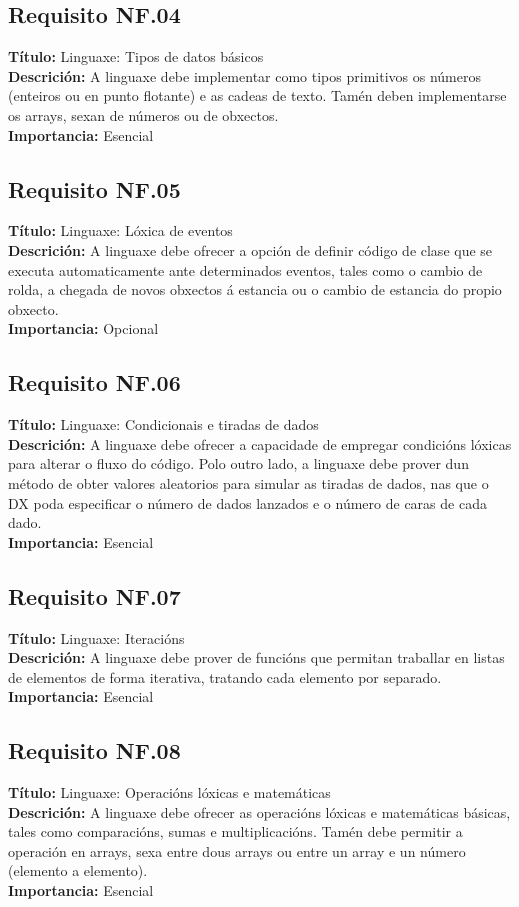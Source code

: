 \subsection{Requisito NF.04}
{\bf Título:} Linguaxe: Tipos de datos básicos\\
{\bf Descrición:} A linguaxe debe implementar como tipos primitivos os números (enteiros ou en punto flotante) e as cadeas de texto. Tamén deben implementarse os arrays, sexan de números ou de obxectos.\\
{\bf Importancia:} Esencial

\subsection{Requisito NF.05}
{\bf Título:} Linguaxe: Lóxica de eventos\\
{\bf Descrición:} A linguaxe debe ofrecer a opción de definir código de clase que se executa automaticamente ante determinados eventos, tales como o cambio de rolda, a chegada de novos obxectos á estancia ou o cambio de estancia do propio obxecto.\\
{\bf Importancia:} Opcional

\subsection{Requisito NF.06}
{\bf Título:} Linguaxe: Condicionais e tiradas de dados\\
{\bf Descrición:} A linguaxe debe ofrecer a capacidade de empregar condicións lóxicas para alterar o fluxo do código. Polo outro lado, a linguaxe debe prover dun método de obter valores aleatorios para simular as tiradas de dados, nas que o DX poda especificar o número de dados lanzados e o número de caras de cada dado.\\
{\bf Importancia:} Esencial

\subsection{Requisito NF.07}
{\bf Título:} Linguaxe: Iteracións\\
{\bf Descrición:} A linguaxe debe prover de funcións que permitan traballar en listas de elementos de forma iterativa, tratando cada elemento por separado.\\
{\bf Importancia:} Esencial

\subsection{Requisito NF.08}
{\bf Título:} Linguaxe: Operacións lóxicas e matemáticas\\
{\bf Descrición:} A linguaxe debe ofrecer as operacións lóxicas e matemáticas básicas, tales como comparacións, sumas e multiplicacións. Tamén debe permitir a operación en arrays, sexa entre dous arrays ou entre un array e un número (elemento a elemento).\\
{\bf Importancia:} Esencial

